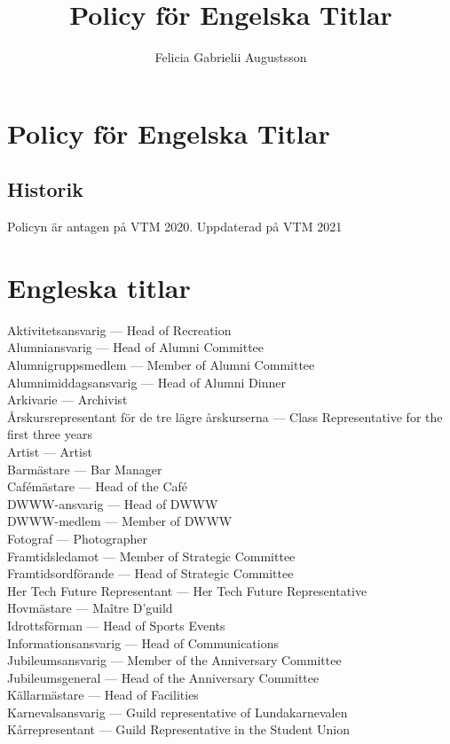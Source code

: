 \documentclass{dsekkallelse}
\title{Policy för Engelska Titlar}
\author{Felicia Gabrielii Augustsson}
\begin{document}
\section{Policy för Engelska Titlar}

\subsection{Historik}
Policyn är antagen på VTM 2020.
Uppdaterad på VTM 2021

\section{Engleska titlar}
Aktivitetsansvarig ---	Head of Recreation \\
Alumniansvarig ---	Head of Alumni Committee\\
Alumnigruppsmedlem ---	Member of Alumni Committee\\
Alumnimiddagsansvarig ---	Head of Alumni Dinner\\
Arkivarie ---	Archivist\\
Årskursrepresentant för de tre lägre årskurserna ---	Class Representative for the first three years\\
Artist ---	Artist\\
Barmästare ---	Bar Manager\\
Cafémästare ---	Head of the Café\\
DWWW-ansvarig ---	Head of DWWW\\
DWWW-medlem ---	Member of DWWW\\
Fotograf ---	Photographer\\
Framtidsledamot ---	Member of Strategic Committee\\
Framtidsordförande ---	Head of Strategic Committee\\
Her Tech Future Representant ---	Her Tech Future Representative\\
Hovmästare ---	Maître D'guild\\
Idrottsförman ---	Head of Sports Events\\
Informationsansvarig ---	Head of Communications\\
Jubileumsansvarig ---	Member of the Anniversary Committee\\
Jubileumsgeneral ---	Head of the Anniversary Committee\\
Källarmästare ---	Head of Facilities\\
Karnevalsansvarig ---	Guild representative of Lundakarnevalen\\
Kårrepresentant ---	Guild Representative in the Student Union\\
\end{document}
